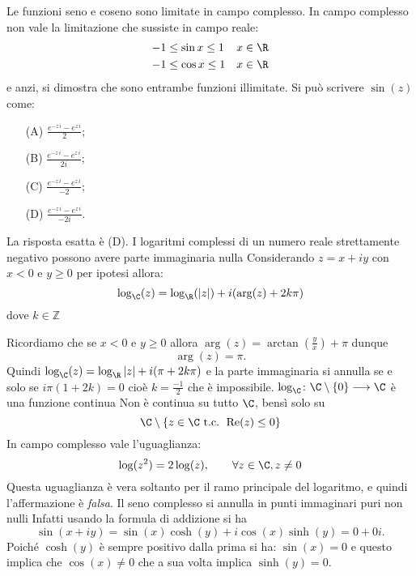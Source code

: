 Le funzioni seno e coseno sono limitate in campo complesso.
    In campo complesso non vale la limitazione che sussiste in campo reale: \begin{align*}
        -1 &\le \sin x \le  1 & x&\in \R \\
        -1 &\le \cos x \le 1 & x&\in \R 
    \end{align*}e anzi, si dimostra che sono entrambe funzioni illimitate.
Si può scrivere $\sin(z)$ come: \begin{itemize}
    \item[(A)] $\frac{e^{-z\, i}-e^{z\, i}}{2}$; 
    \item[(B)] $\frac{e^{-z\, i}-e^{z\, i}}{2i}$; 
    \item[(C)] $\frac{e^{-z\, i}-e^{z\, i}}{-2}$;
    \item[(D)] $\frac{e^{-z\, i}-e^{z\, i}}{-2i}$. 
\end{itemize}
    La risposta esatta è (D).
    I logaritmi complessi di un numero reale strettamente negativo possono avere parte immaginaria nulla
Considerando $z=x+iy$ con $x<0$ e $y\ge 0$ per ipotesi allora: 
\[\log_{\C}(z)=\log_{\R}(\left\vert z\right\vert)+i(\text{arg}(z)+2k\pi)\]dove $k\in\mathbb{Z}$

Ricordiamo che se $x<0$ e $y\ge 0$ allora  $\operatorname{arg}(z)=\operatorname{arctan}(\frac{y}{x})+\pi$ dunque 
\[\operatorname{arg}(z)=\pi.\]Quindi $\log_{\C}(z)=\log_{\R}\left\vert z\right\vert+i(\pi+2k\pi)$ e la parte immaginaria si annulla se e solo se  $i\pi(1+2k)=0$ cioè $k=\frac{-1}{2}$ che è impossibile.
$\log_{\C}\colon\C\setminus\{0\} \longrightarrow\C$ è una funzione continua
    Non è continua su tutto $ \C $, bensì solo su \[
        \C\setminus\{z\in\C \text{ t.c. } \operatorname{Re}(z) \le 0\}
    \]
In campo complesso vale l'uguaglianza: \[\log(z^2)=2\log(z) , \qquad  \forall z \in\C , z\neq0\]
    Questa uguaglianza è vera soltanto per il ramo principale del logaritmo, e quindi l'affermazione è \emph{falsa}.
    Il seno complesso si annulla in punti immaginari puri non nulli
Infatti usando la formula di addizione si ha 
\[\sin (x+iy)=\sin(x)\cosh(y)+i\cos(x)\sinh(y)= 0+0i.\]
Poiché $\cosh(y)$ è sempre positivo dalla prima si ha: $\sin(x)=0$ e questo implica che $\cos(x)\neq0$ che a sua volta implica $\sinh(y)=0$. 

